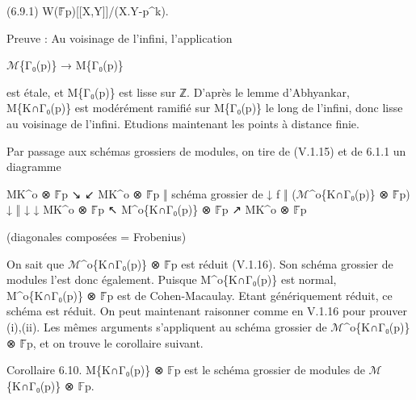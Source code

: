 \documentclass[11pt,a4paper]{article}
\begin{document}
(6.9.1)        W(\ensuremath{\mathbb{F}}̄\textunderscore{}p)[[X,Y]]/(X.Y-p\textasciicircum{}k).

Preuve : Au voisinage de l'infini, l'application

\ensuremath{\mathcal{M}}\textunderscore{}\{Γ₀(p)\}  →  M\textunderscore{}\{Γ₀(p)\}

est étale, et M\textunderscore{}\{Γ₀(p)\} est lisse sur ℤ. D'après le lemme d'Abhyankar, M\textunderscore{}\{K∩Γ₀(p)\} est modérément ramifié sur M\textunderscore{}\{Γ₀(p)\} le long de l'infini, donc lisse au voisinage de l'infini. Etudions maintenant les points à distance finie.

Par passage aux schémas grossiers de modules, on tire de (V.1.15) et de 6.1.1 un diagramme

M\textunderscore{}K\textasciicircum{}o ⊗ \ensuremath{\mathbb{F}}̄\textunderscore{}p        ↘                              ↙        M\textunderscore{}K\textasciicircum{}o ⊗ \ensuremath{\mathbb{F}}̄\textunderscore{}p ‖                         schéma grossier de                         ↓ f ‖                 (\ensuremath{\mathcal{M}}\textasciicircum{}o\textunderscore{}\{K∩Γ₀(p)\} ⊗ \ensuremath{\mathbb{F}}̄\textunderscore{}p)                           ↓ ‖                                  ↓                                ↓ M\textunderscore{}K\textasciicircum{}o ⊗ \ensuremath{\mathbb{F}}̄\textunderscore{}p        ↖        M\textasciicircum{}o\textunderscore{}\{K∩Γ₀(p)\} ⊗ \ensuremath{\mathbb{F}}̄\textunderscore{}p        ↗        M\textunderscore{}K\textasciicircum{}o ⊗ \ensuremath{\mathbb{F}}̄\textunderscore{}p

(diagonales composées = Frobenius)

On sait que \ensuremath{\mathcal{M}}\textasciicircum{}o\textunderscore{}\{K∩Γ₀(p)\} ⊗ \ensuremath{\mathbb{F}}̄\textunderscore{}p est réduit (V.1.16). Son schéma grossier de modules l'est donc également. Puisque M\textasciicircum{}o\textunderscore{}\{K∩Γ₀(p)\} est normal, M\textasciicircum{}o\textunderscore{}\{K∩Γ₀(p)\} ⊗ \ensuremath{\mathbb{F}}̄\textunderscore{}p est de Cohen-Macaulay. Etant génériquement réduit, ce schéma est réduit. On peut maintenant raisonner comme en V.1.16 pour prouver (i),(ii). Les mêmes arguments s'appliquent au schéma grossier de \ensuremath{\mathcal{M}}\textasciicircum{}o\textunderscore{}\{K∩Γ₀(p)\} ⊗ \ensuremath{\mathbb{F}}̄\textunderscore{}p, et on trouve le corollaire suivant.

Corollaire 6.10. M\textunderscore{}\{K∩Γ₀(p)\} ⊗ \ensuremath{\mathbb{F}}\textunderscore{}p est le schéma grossier de modules de \ensuremath{\mathcal{M}}\textunderscore{}\{K∩Γ₀(p)\} ⊗ \ensuremath{\mathbb{F}}\textunderscore{}p.
\end{document}
